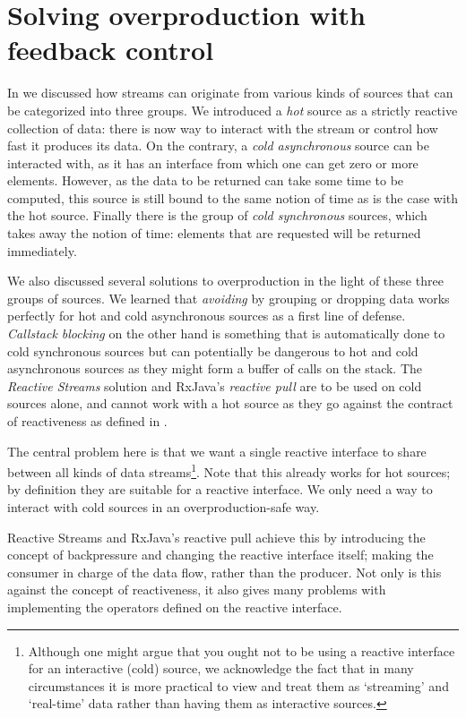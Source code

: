 \chapter{Solving overproduction with feedback control}
\label{chap:solving-overproduction}

In  we discussed how streams can originate from various kinds of sources that can be categorized into three groups. We introduced a \textit{hot} source as a strictly reactive collection of data: there is now way to interact with the stream or control how fast it produces its data. On the contrary, a \textit{cold asynchronous} source can be interacted with, as it has an interface from which one can get zero or more elements. However, as the data to be returned can take some time to be computed, this source is still bound to the same notion of time as is the case with the hot source. Finally there is the group of \textit{cold synchronous} sources, which takes away the notion of time: elements that are requested will be returned immediately.

We also discussed several solutions to overproduction in the light of these three groups of sources. We learned that \textit{avoiding} by grouping or dropping data works perfectly for hot and cold asynchronous sources as a first line of defense. \textit{Callstack blocking} on the other hand is something that is automatically done to cold synchronous sources but can potentially be dangerous to hot and cold asynchronous sources as they might form a buffer of calls on the stack. The \textit{Reactive Streams} solution and RxJava's \textit{reactive pull} are to be used on cold sources alone, and cannot work with a hot source as they go against the contract of reactiveness as defined in \cite{berry1991-Reactive}.

The central problem here is that we want a single reactive interface to share between all kinds of data streams\footnote{Although one might argue that you ought not to be using a reactive interface for an interactive (cold) source, we acknowledge the fact that in many circumstances it is more practical to view and treat them as `streaming' and `real-time' data rather than having them as interactive sources.}. Note that this already works for hot sources; by definition they are suitable for a reactive interface. We only need a way to interact with cold sources in an overproduction-safe way.

Reactive Streams and RxJava's reactive pull achieve this by introducing the concept of backpressure and changing the reactive interface itself; making the consumer in charge of the data flow, rather than the producer. Not only is this against the concept of reactiveness, it also gives many problems with implementing the operators defined on the reactive interface.

